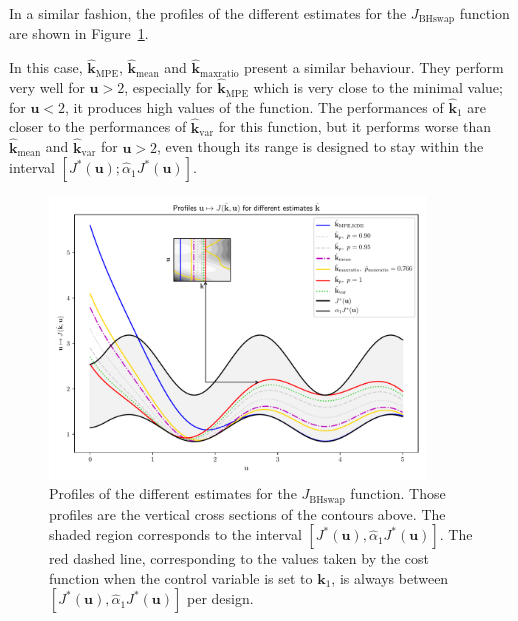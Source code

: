 \documentclass[preprint, 1p]{elsarticle}
\newcommand{\hatkmean}{\hat{\mathbf{k}}_{\mathrm{mean}}}
\newcommand{\hatkvar}{\hat{\mathbf{k}}_{\mathrm{var}}}
\newcommand{\hatkmpe}{\hat{\mathbf{k}}_{\mathrm{MPE}}}
\newcommand{\checka}{{\alpha}}
\newcommand{\checkk}{\mathbf{k}}
\begin{document}
In a similar fashion, the profiles of the different estimates for the $J_{\mathrm{BHswap}}$ function are shown in Figure~\ref{fig:profiles_branin_switch}.

In this case, $\hatkmpe$, $\hatkmean$ and $\hat{\checkk}_{\mathrm{maxratio}}$ present a similar behaviour. They perform very well for $\mathbf{u}>2$, especially for $\hatkmpe$ which is very close to the minimal value; for $\mathbf{u}<2$, it produces high values of the function. 
The performances of $\hat{\checkk}_1$ are closer to the performances of $\hatkvar$ for this function, but it performs worse than $\hatkmean$ and $\hatkvar$ for $\mathbf{u}>2$, even though its range is designed to stay within the interval $[J^*(\mathbf{u}); \hat{\checka}_1 J^*(\mathbf{u})]$.


\begin{figure}[t]
  \centering
\includegraphics[width=10cm]{Figures/profile_BHs_all_estimates_noku.pdf}
\caption{Profiles of the different estimates for the $J_{\mathrm{BHswap}}$ function. Those profiles are the vertical cross sections of the contours above. The shaded region corresponds to the interval $[J^*(\mathbf{u}), \hat{\checka}_1 J^*(\mathbf{u})]$. The red dashed line, corresponding to the values taken by the cost function when the control variable is set to $\mathbf{k}_1$, is always between $[J^*(\mathbf{u}), \hat{\checka}_1 J^*(\mathbf{u})]$ per design.}
\label{fig:profiles_branin_switch}
\end{figure}





\clearpage

\end{document}
